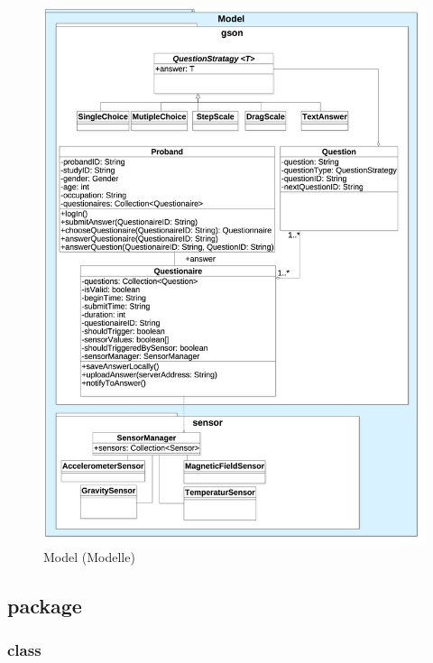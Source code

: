 \documentclass[a4paper]{scrreprt}
\begin{document}
            \begin{figure}[H]
                \centering
                \includegraphics[scale=0.28]{Model.jpg}
                \caption{Model (Modelle)}
            \end{figure}


            \newpage
            \subsection{package }

                \subsubsection{class }
\end{document}
